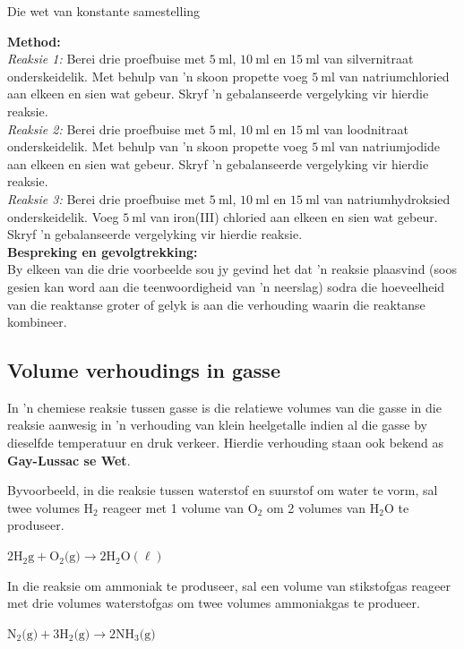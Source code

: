 \begin{Investigation}{Die wet van konstante samestelling}
\begin{minipage}{.6\textwidth}
\begin{center}
{}
 \end{center}
\end{minipage}
\textbf{Method:}\\
\textsl{Reaksie 1:} Berei drie proefbuise met $5~\text{ml}$, $10~\text{ml}$ en $15~\text{ml}$ van silvernitraat onderskeidelik. Met behulp van 'n skoon propette voeg $5~\text{ml}$ van natriumchloried aan elkeen en sien wat gebeur. Skryf 'n gebalanseerde vergelyking vir hierdie reaksie.\\
\textsl{Reaksie 2:} Berei drie proefbuise met $5~\text{ml}$, $10~\text{ml}$ en $15~\text{ml}$  van loodnitraat onderskeidelik. Met behulp van 'n skoon propette voeg $5~\text{ml}$ van natriumjodide aan elkeen en sien wat gebeur. Skryf 'n gebalanseerde vergelyking vir hierdie reaksie.\\
\textsl{Reaksie 3:} Berei drie proefbuise met $5~\text{ml}$, $10~\text{ml}$ en $15~\text{ml}$  van natriumhydroksied onderskeidelik. Voeg $5~\text{ml}$ van iron(III) chloried aan elkeen en sien wat gebeur. Skryf 'n gebalanseerde vergelyking vir hierdie reaksie. \\
\textbf{Bespreking en gevolgtrekking:} \\
By elkeen van die drie voorbeelde sou jy gevind het dat 'n reaksie plaasvind (soos gesien kan word aan die teenwoordigheid van 'n neerslag) sodra die hoeveelheid van die reaktanse groter of gelyk is aan die verhouding waarin die reaktanse kombineer.  
\end{Investigation}

    \label{m38711*cid7}
            \subsection*{Volume verhoudings in gasse}
            \nopagebreak
      \label{m38711*id65179}In 'n chemiese reaksie tussen gasse is die relatiewe volumes van die gasse in die reaksie aanwesig in 'n verhouding van klein heelgetalle indien al die gasse by dieselfde temperatuur en druk verkeer. Hierdie verhouding staan ook bekend as \textbf{Gay-Lussac se Wet}.\par 
      \label{m38711*id65189}Byvoorbeeld, in die reaksie tussen waterstof en suurstof om water te vorm, sal twee volumes $\text{H}{}_{2}$ reageer met 1 volume van $\text{O}_{2}$ om 2 volumes van $\text{H}_{2}\text{O}$ te produseer.\par 
      \label{m38711*id65237}$2\text{H}_{2}\text{g} +\text{O}_{2} \text{(g)} \to 2\text{H}_{2}\text{O} (\ell)$\par 
      \label{m38711*id65282}In die reaksie om ammoniak te produseer, sal een volume van stikstofgas reageer met drie volumes waterstofgas om twee volumes ammoniakgas te produeer.\par 
      \label{m38711*id65286}$\text{N}_{2} \text{(g)}+3\text{H}_{2} \text{(g)} \to 2\text{NH}_{3} \text{(g)}$
      \par  
    \label{m38711*cid8}
